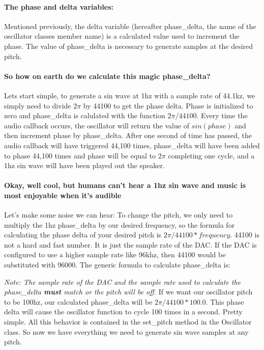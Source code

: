 \documentclass[acmlarge,screen]{acmart}
\begin{document}
	\paragraph{The phase and delta variables:} Mentioned previously, the delta variable (hereafter phase\_delta, the name of the oscillator classes member name) is a calculated value used to increment the phase. The value of phase\_delta is necessary to generate samples at the desired pitch.
	\paragraph{So how on earth do we calculate this magic phase\_delta?} Lets start simple, to generate a sin wave at 1hz with a sample rate of 44.1kz, we simply need to divide \( 2\pi \) by 44100 to get the phase delta. Phase is initialized to zero and phase\_delta is calulated with the function \( 2\pi/44100 \). Every time the audio callback occurs, the oscillator will return the value of \( sin(phase) \) and then increment phase by phase\_delta. After one second of time has passed, the audio callback will have triggered 44,100 times, phase\_delta will have been added to phase 44,100 times and phase will be equal to \( 2\pi \) completing one cycle, and a 1hz sin wave will have been played out the speaker. 
	
	\paragraph{Okay, well cool, but humans can't hear a 1hz sin wave and music is most enjoyable when it's audible} Let's make some noise we can hear: To change the pitch, we only need to multiply the 1hz phase\_delta by our desired frequency, so the formula for calculating the phase delta of your desired pitch is \( 2\pi/44100 * frequency \). 44100 is not a hard and fast number. It is just the sample rate of the DAC. If the DAC is configured to use a higher sample rate like 96khz, then 44100 would be substituted with 96000. The generic formula to calculate phase\_delta is: 
	
	
	\textit{Note: The sample rate of the DAC and the sample rate used to calculate the phase\_delta \textbf{must} match or the pitch will be off.} If we want our oscillator pitch to be 100hz, our calculated phase\_delta will be \( 2\pi/44100 * 100.0\). This phase delta will cause the oscillator function to cycle 100 times in a second. Pretty simple. All this behavior is contained in the set\_pitch method in the Oscillator class. So now we have everything we need to generate sin wave samples at any pitch.
	
\end{document}
